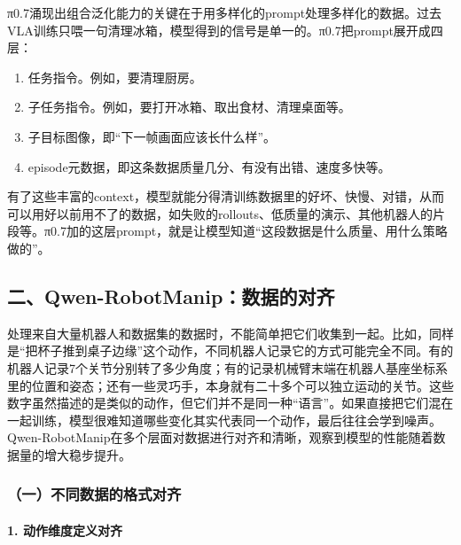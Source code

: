 π0.7涌现出组合泛化能力的关键在于用多样化的prompt处理多样化的数据。过去VLA训练只喂一句清理冰箱，模型得到的信号是单一的。π0.7把prompt展开成四层：

\begin{enumerate}
\def\labelenumi{\arabic{enumi}.}
\item
  任务指令。例如，要清理厨房。
\item
  子任务指令。例如，要打开冰箱、取出食材、清理桌面等。
\item
  子目标图像，即``下一帧画面应该长什么样''。
\item
  episode元数据，即这条数据质量几分、有没有出错、速度多快等。
\end{enumerate}

有了这些丰富的context，模型就能分得清训练数据里的好坏、快慢、对错，从而可以用好以前用不了的数据，如失败的rollouts、低质量的演示、其他机器人的片段等。π0.7加的这层prompt，就是让模型知道``这段数据是什么质量、用什么策略做的''。

\hypertarget{ux4e8cqwen-robotmanipux6570ux636eux7684ux5bf9ux9f50}{%
\subsection{二、Qwen-RobotManip：数据的对齐}\label{ux4e8cqwen-robotmanipux6570ux636eux7684ux5bf9ux9f50}}

处理来自大量机器人和数据集的数据时，不能简单把它们收集到一起。比如，同样是``把杯子推到桌子边缘''这个动作，不同机器人记录它的方式可能完全不同。有的机器人记录7个关节分别转了多少角度；有的记录机械臂末端在机器人基座坐标系里的位置和姿态；还有一些灵巧手，本身就有二十多个可以独立运动的关节。这些数字虽然描述的是类似的动作，但它们并不是同一种``语言''。如果直接把它们混在一起训练，模型很难知道哪些变化其实代表同一个动作，最后往往会学到噪声。Qwen-RobotManip在多个层面对数据进行对齐和清晰，观察到模型的性能随着数据量的增大稳步提升。

\hypertarget{ux4e00ux4e0dux540cux6570ux636eux7684ux683cux5f0fux5bf9ux9f50}{%
\subsubsection{（一）不同数据的格式对齐}\label{ux4e00ux4e0dux540cux6570ux636eux7684ux683cux5f0fux5bf9ux9f50}}

\hypertarget{ux52a8ux4f5cux7ef4ux5ea6ux5b9aux4e49ux5bf9ux9f50}{%
\paragraph{1. 动作维度定义对齐}\label{ux52a8ux4f5cux7ef4ux5ea6ux5b9aux4e49ux5bf9ux9f50}}

